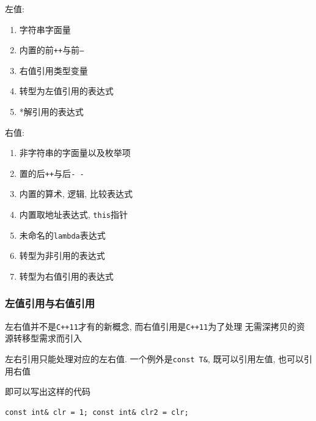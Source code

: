 \begin{paracol}{2}
	\begin{leftcolumn}
		左值:
		\begin{enumerate}
			\item 字符串字面量
			\item 内置的前{\tt ++}与前{\tt --}
			\item 右值引用类型变量
			\item 转型为左值引用的表达式
			\item *解引用的表达式
		\end{enumerate}
	\end{leftcolumn}
	\begin{rightcolumn}
		右值:
		\begin{enumerate}
			\item 非字符串的字面量以及枚举项
			\item 置的后{\tt++}与后{\tt- -}
			\item 内置的算术, 逻辑, 比较表达式
			\item 内置取地址表达式, {\tt this}指针
			\item 未命名的{\tt lambda}表达式
			\item 转型为非引用的表达式
			\item 转型为右值引用的表达式
		\end{enumerate}
	\end{rightcolumn}
\end{paracol}
\subsubsection{左值引用与右值引用}

左右值并不是{\tt C++11}才有的新概念, 而右值引用是{\tt C++11}为了处理
	无需深拷贝的资源转移型需求而引入

左右引用只能处理对应的左右值. 一个例外是{\tt const T\&}, 既可以引用左值, 也可以引用右值

\noindent 即可以写出这样的代码
\begin{lstlisting}[basicstyle=\small,columns=flexible,xleftmargin=14em]
const int& clr = 1; const int& clr2 = clr;
\end{lstlisting}

